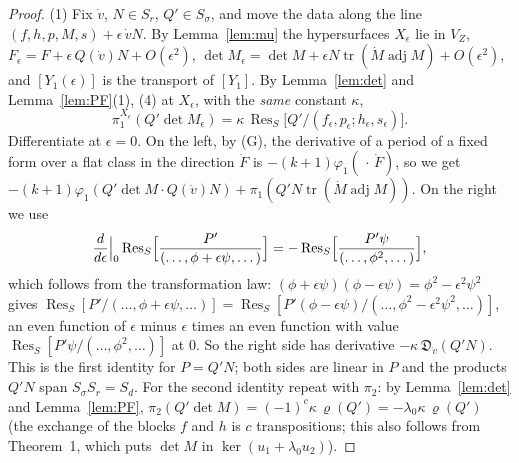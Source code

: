\documentclass[11pt]{article}
\numberwithin{equation}{section}
\theoremstyle{remark}
\newcommand{\VZ}{V_Z}
\newcommand{\Res}{\operatorname{Res}}
\newcommand{\lz}{\lambda_0}
\begin{document}
\begin{proof}
(1) Fix $\dot v$, $N\in S_r$, $Q'\in S_\sigma$, and move the data along the line
$(f,h,p,M,s)+\epsilon\,\dot vN$. By Lemma~\ref{lem:mu} the hypersurfaces $X_\epsilon$ lie in $\VZ$,
$F_\epsilon=F+\epsilon\,Q(\dot v)N+O(\epsilon^2)$, $\det M_\epsilon=\det M+\epsilon N\operatorname{tr}(\dot M\operatorname{adj}M)+O(\epsilon^2)$,
and $[Y_1(\epsilon)]$ is the transport of $[Y_1]$. By Lemma~\ref{lem:det} and Lemma~\ref{lem:PF}(1), (4) at $X_\epsilon$, with the
\emph{same} constant $\kappa$,
\begin{equation}\label{eq:first}
\pi_1^{X_\epsilon}(Q'\det M_\epsilon)=\kappa\,\Res_S\bigl[Q'/(f_\epsilon,p_\epsilon;h_\epsilon,s_\epsilon)\bigr].
\end{equation}
Differentiate at $\epsilon=0$. On the left, by (G), the derivative of a period of a fixed form over a flat class
in the direction $\dot F$ is $-(k+1)\varphi_1(\,\cdot\,\dot F)$, so we get
$-(k+1)\varphi_1(Q'\det M\cdot Q(\dot v)N)+\pi_1(Q'N\operatorname{tr}(\dot M\operatorname{adj}M))$. On the right we use
\[
\frac{d}{d\epsilon}\Big|_0\Res_S\Bigl[\frac{P'}{(\dots,\phi+\epsilon\psi,\dots)}\Bigr]=-\Res_S\Bigl[\frac{P'\psi}{(\dots,\phi^2,\dots)}\Bigr],
\]
which follows from the transformation law: $(\phi+\epsilon\psi)(\phi-\epsilon\psi)=\phi^2-\epsilon^2\psi^2$ gives
$\Res_S[P'/(\dots,\phi+\epsilon\psi,\dots)]=\Res_S[P'(\phi-\epsilon\psi)/(\dots,\phi^2-\epsilon^2\psi^2,\dots)]$, an
even function of $\epsilon$ minus $\epsilon$ times an even function with value $\Res_S[P'\psi/(\dots,\phi^2,\dots)]$ at
$0$. So the right side has derivative $-\kappa\,\mathfrak D_{\dot v}(Q'N)$. This is the first identity for $P=Q'N$;
both sides are linear in $P$ and the products $Q'N$ span $S_\sigma S_r=S_d$. For the second identity repeat with
$\pi_2$: by Lemma~\ref{lem:det} and Lemma~\ref{lem:PF}, $\pi_2(Q'\det M)=(-1)^c\kappa\,\varrho(Q')=-\lz\kappa\,\varrho(Q')$ (the
exchange of the blocks $f$ and $h$ is $c$ transpositions; this also follows from Theorem~1, which puts $\det M$
in $\ker(u_1+\lz u_2)$).


\end{proof}
\end{document}
